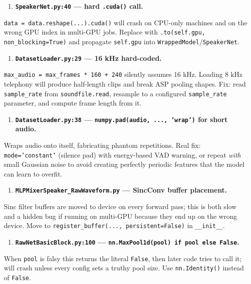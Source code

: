 \documentclass[10pt,a4paper]{article}
\begin{document}
\begin{enumerate}[leftmargin=*,itemsep=2pt]
  \item \textbf{\texttt{SpeakerNet.py:40} --- hard \texttt{.cuda()} call.}
\end{enumerate}
\texttt{data = data.reshape(...).cuda()} will crash on CPU-only machines and on the wrong GPU index in multi-GPU jobs. Replace with \texttt{.to(self.gpu, non\_blocking=True)} and propagate \texttt{self.gpu} into \texttt{WrappedModel}/\texttt{SpeakerNet}.

\begin{enumerate}[leftmargin=*,itemsep=2pt]
  \item \textbf{\texttt{DatasetLoader.py:29} --- 16 kHz hard-coded.}
\end{enumerate}
\texttt{max\_audio = max\_frames * 160 + 240} silently assumes 16 kHz. Loading 8 kHz telephony will produce half-length clips and break ASP pooling shapes. Fix: read \texttt{sample\_rate} from \texttt{soundfile.read}, resample to a configured \texttt{sample\_rate} parameter, and compute frame length from it.

\begin{enumerate}[leftmargin=*,itemsep=2pt]
  \item \textbf{\texttt{DatasetLoader.py:38} --- \texttt{numpy.pad(audio, ..., 'wrap')} for short audio.}
\end{enumerate}
Wraps audio onto itself, fabricating phantom repetitions. Real fix: \texttt{mode='constant'} (silence pad) with energy-based VAD warning, or repeat \textit{with} small Gaussian noise to avoid creating perfectly periodic features that the model can learn to overfit.

\begin{enumerate}[leftmargin=*,itemsep=2pt]
  \item \textbf{\texttt{MLPMixerSpeaker\_RawWaveform.py} --- SincConv buffer placement.}
\end{enumerate}
Sinc filter buffers are moved to device on every forward pass; this is both slow and a hidden bug if running on multi-GPU because they end up on the wrong device. Move to \texttt{register\_buffer(..., persistent=False)} in \texttt{\_\_init\_\_}.

\begin{enumerate}[leftmargin=*,itemsep=2pt]
  \item \textbf{\texttt{RawNetBasicBlock.py:100} --- \texttt{nn.MaxPool1d(pool) if pool else False}.}
\end{enumerate}
When \texttt{pool} is falsy this returns the literal \texttt{False}, then later code tries to call it; will crash unless every config sets a truthy pool size. Use \texttt{nn.Identity()} instead of \texttt{False}.
\end{document}
